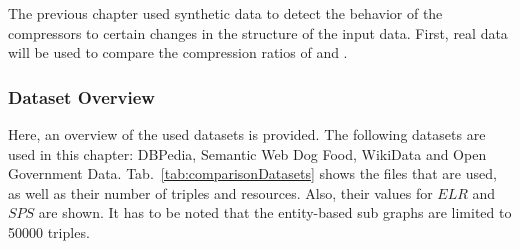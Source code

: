 The previous chapter used synthetic data to detect the behavior of the compressors to certain changes in the structure of the input data. First, real data will be used to compare the compression ratios of \GHDT{} and \GGRP{}. 

\subsubsection{Dataset Overview}

Here, an overview of the used datasets is provided. The following datasets are used in this chapter: DBPedia, Semantic Web Dog Food, WikiData and Open Government Data. Tab.~\ref{tab:comparisonDatasets} shows the files that are used, as well as their number of triples and resources. Also, their values for $ELR$ and $SPS$ are shown. It has to be noted that the entity-based sub graphs are limited to 50000 triples.

